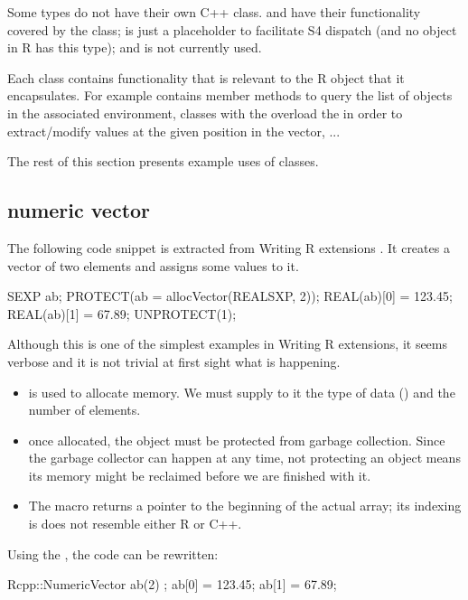 Some types do not have their own C++ class.  and 
 have their functionality covered by the 
class;  is just a placeholder to facilitate S4 dispatch 
(and no object in R has this type); and  is not currently 
used.

Each class contains functionality that is relevant to the R object
that it encapsulates. For example  contains 
member methods to query the list of objects in the associated environment, 
classes with the  overload the  in order
to extract/modify values at the given position in the vector, ...

The rest of this section presents example uses of  classes. 

\subsection{numeric vector}

The following code snippet is extracted from Writing R extensions
\citep{R:exts}. It creates a  vector of two elements 
and assigns some values to it. 

\begin{example}
SEXP ab;
PROTECT(ab = allocVector(REALSXP, 2));
REAL(ab)[0] = 123.45;
REAL(ab)[1] = 67.89;
UNPROTECT(1);
\end{example}

Although this is one of the simplest examples in Writing R extensions, 
it seems verbose and it is not trivial at first sight what is happening.
\begin{itemize}
\item {} is used to allocate memory. We must supply to it 
the type of data () and the number of elements.
\item once allocated, the  object must be protected from
garbage collection. Since the garbage collector can happen at any time, 
not protecting an object means its memory might be reclaimed before we are
finished with it.
\item The  macro returns a pointer to the beginning of the 
actual array; its indexing is does not resemble either R or C++.
\end{itemize}

Using the , the code can be rewritten: 


\begin{example}
Rcpp::NumericVector ab(2) ;
ab[0] = 123.45;
ab[1] = 67.89;
\end{example}

